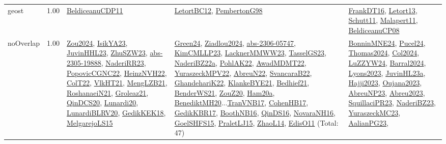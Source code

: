 {\begin{longtable}{p{3cm}r>{\raggedright\arraybackslash}p{6cm}>{\raggedright\arraybackslash}p{6cm}>{\raggedright\arraybackslash}p{8cm}}
\index{geost}\index{Constraints!geost}geost &  1.00 & \hyperref[detail:BeldiceanuCDP11]{BeldiceanuCDP11} & \hyperref[detail:LetortBC12]{LetortBC12}, \hyperref[detail:PembertonG98]{PembertonG98} & \hyperref[detail:FrankDT16]{FrankDT16}, \hyperref[detail:Letort13]{Letort13}, \hyperref[detail:Schutt11]{Schutt11}, \hyperref[detail:Malapert11]{Malapert11}, \hyperref[detail:BeldiceanuCP08]{BeldiceanuCP08}\\
\index{noOverlap}\index{Constraints!noOverlap}noOverlap &  1.00 & \hyperref[detail:Zou2024]{Zou2024}, \hyperref[detail:IsikYA23]{IsikYA23}, \hyperref[detail:JuvinHHL23]{JuvinHHL23}, \hyperref[detail:ZhuSZW23]{ZhuSZW23}, \hyperref[detail:abs-2305-19888]{abs-2305-19888}, \hyperref[detail:NaderiRR23]{NaderiRR23}, \hyperref[detail:PopovicCGNC22]{PopovicCGNC22}, \hyperref[detail:HeinzNVH22]{HeinzNVH22}, \hyperref[detail:ColT22]{ColT22}, \hyperref[detail:VlkHT21]{VlkHT21}, \hyperref[detail:MengLZB21]{MengLZB21}, \hyperref[detail:RoshanaeiN21]{RoshanaeiN21}, \hyperref[detail:Groleaz21]{Groleaz21}, \hyperref[detail:QinDCS20]{QinDCS20}, \hyperref[detail:Lunardi20]{Lunardi20}, \hyperref[detail:LunardiBLRV20]{LunardiBLRV20}, \hyperref[detail:GedikKEK18]{GedikKEK18}, \hyperref[detail:MelgarejoLS15]{MelgarejoLS15} & \hyperref[detail:Green24]{Green24}, \hyperref[detail:Ziadlou2024]{Ziadlou2024}, \hyperref[detail:abs-2306-05747]{abs-2306-05747}, \hyperref[detail:KimCMLLP23]{KimCMLLP23}, \hyperref[detail:LacknerMMWW23]{LacknerMMWW23}, \hyperref[detail:TasselGS23]{TasselGS23}, \hyperref[detail:NaderiBZ22a]{NaderiBZ22a}, \hyperref[detail:PohlAK22]{PohlAK22}, \hyperref[detail:AwadMDMT22]{AwadMDMT22}, \hyperref[detail:YuraszeckMPV22]{YuraszeckMPV22}, \hyperref[detail:AbreuN22]{AbreuN22}, \hyperref[detail:SvancaraB22]{SvancaraB22}, \hyperref[detail:GhandehariK22]{GhandehariK22}, \hyperref[detail:KlankeBYE21]{KlankeBYE21}, \hyperref[detail:Bedhief21]{Bedhief21}, \hyperref[detail:BenderWS21]{BenderWS21}, \hyperref[detail:ZouZ20]{ZouZ20}, \hyperref[detail:Ham20a]{Ham20a}, \hyperref[detail:BenediktMH20]{BenediktMH20}...\hyperref[detail:TranVNB17]{TranVNB17}, \hyperref[detail:CohenHB17]{CohenHB17}, \hyperref[detail:GedikKBR17]{GedikKBR17}, \hyperref[detail:BoothNB16]{BoothNB16}, \hyperref[detail:QinDS16]{QinDS16}, \hyperref[detail:NovaraNH16]{NovaraNH16}, \hyperref[detail:GoelSHFS15]{GoelSHFS15}, \hyperref[detail:PraletLJ15]{PraletLJ15}, \hyperref[detail:ZhaoL14]{ZhaoL14}, \hyperref[detail:EdisO11]{EdisO11} (Total: 47) & \hyperref[detail:BonninMNE24]{BonninMNE24}, \hyperref[detail:Pucel24]{Pucel24}, \hyperref[detail:Thomas2024]{Thomas2024}, \hyperref[detail:Col2024]{Col2024}, \hyperref[detail:LuZZYW24]{LuZZYW24}, \hyperref[detail:Barral2024]{Barral2024}, \hyperref[detail:Lyons2023]{Lyons2023}, \hyperref[detail:JuvinHL23a]{JuvinHL23a}, \hyperref[detail:Hajji2023]{Hajji2023}, \hyperref[detail:Oujana2023]{Oujana2023}, \hyperref[detail:AbreuNP23]{AbreuNP23}, \hyperref[detail:Abreu2023]{Abreu2023}, \hyperref[detail:SquillaciPR23]{SquillaciPR23}, \hyperref[detail:NaderiBZ23]{NaderiBZ23}, \hyperref[detail:YuraszeckMC23]{YuraszeckMC23}, \hyperref[detail:AalianPG23]{AalianPG23}, 
\end{longtable}}
